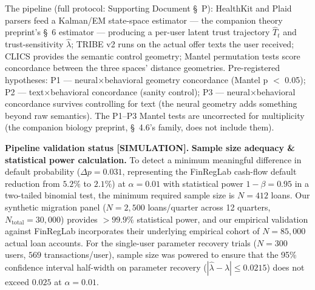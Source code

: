 \documentclass[
]{article}
\begin{document}
The pipeline (full protocol: Supporting Document §~P): HealthKit and
Plaid parsers feed a Kalman/EM state-space estimator --- the companion
theory preprint's §~6 estimator --- producing a per-user latent trust
trajectory \(\hat{T}_t\) and trust-sensitivity \(\hat{\lambda}\); TRIBE
v2 runs on the actual offer texts the user received; CLICS provides the
semantic control geometry; Mantel permutation tests score concordance
between the three spaces' distance geometries. Pre-registered
hypotheses: P1 --- neural\(\times\)behavioral geometry concordance
(Mantel p \(<\) 0.05); P2 --- text\(\times\)behavioral concordance
(sanity control); P3 --- neural\(\times\)behavioral concordance survives
controlling for text (the neural geometry adds something beyond raw
semantics). The P1--P3 Mantel tests are uncorrected for multiplicity
(the companion biology preprint, §~4.6's family, does not include them).

\textbf{Pipeline validation status {[}SIMULATION{]}.} \textbf{Sample
size adequacy \& statistical power calculation.} To detect a minimum
meaningful difference in default probability (\(\Delta p = 0.031\),
representing the FinRegLab cash-flow default reduction from \(5.2\%\) to
\(2.1\%\)) at \(\alpha = 0.01\) with statistical power
\(1 - \beta = 0.95\) in a two-tailed binomial test, the minimum required
sample size is \(N = 412\) loans. Our synthetic migration panel
(\(N = 2,500\) loans/quarter across 12 quarters,
\(N_{\mathrm{total}} = 30,000\)) provides \(> 99.9\%\) statistical
power, and our empirical validation against FinRegLab incorporates their
underlying empirical cohort of \(N = 85,000\) actual loan accounts. For
the single-user parameter recovery trials (\(N = 300\) users, \(569\)
transactions/user), sample size was powered to ensure that the 95\%
confidence interval half-width on parameter recovery
(\(|\hat{\lambda} - \lambda| \le 0.0215\)) does not exceed \(0.025\) at
\(\alpha = 0.01\).
\end{document}

